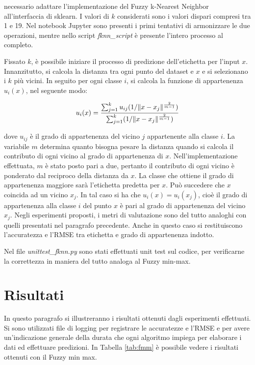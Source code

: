 \documentclass[11pt,  oneside, openany]{book}
\begin{document}
necessario adattare l'implementazione del Fuzzy k-Nearest Neighbor all'interfaccia di sklearn. I valori di $k$ considerati sono i valori dispari compresi tra 1 e 19. Nel notebook Jupyter sono presenti i primi tentativi di armonizzare le due operazioni, mentre nello script \textit{fknn\_script} è presente l'intero processo al completo. 

Fissato $k$, è possibile iniziare il processo di predizione dell'etichetta per l'input $x$. Innanzitutto, si calcola la distanza tra ogni punto del dataset e $x$ e si selezionano i $k$ più vicini. In seguito per ogni classe $i$, si calcola la funzione di appartenenza $u_{i}(x)$, nel seguente modo: 

\begin{equation} \label{eq:2}
u_{i}(x) = {\sum_{j=1}^k u_{ij}({1 / \Vert x-x_j\Vert^{\frac{2}{m-1}}}) \over \sum_{j=1}^k ({1 / \Vert x-x_j\Vert^{\frac{2}{m-1}}}) }
\end{equation}

\noindent dove $u_{ij}$ è il grado di appartenenza del vicino $j$ appartenente alla classe $i$. La variabile $m$ determina quanto bisogna pesare la distanza quando si calcola il contributo di ogni vicino al grado di appartenenza di $x$. Nell'implementazione effettuata, $m$ è stato posto pari a due, pertanto il contributo di ogni vicino è ponderato dal reciproco della distanza da $x$. La classe che ottiene il grado di appartenenza maggiore sarà l'etichetta predetta per $x$. Può succedere che $x$ coincida ad un vicino $x_j$. In tal caso si ha che $u_i(x) = u_i(x_j) $, cioè il grado di appartenenza alla classe $i$ del punto $x$ è pari al grado di appartenenza del vicino $x_j$. 
Negli esperimenti proposti, i metri di valutazione sono del tutto analoghi con quelli presentati nel paragrafo precedente. Anche in questo caso si restituiscono l'accuratezza e l'RMSE tra etichetta e grado di appartenenza indotto.

Nel file \textit{unittest\_fknn.py} sono stati effettuati unit test sul codice, per verificarne la correttezza in maniera del tutto analoga al Fuzzy min-max. 

	\section{Risultati}


In questo paragrafo si illustreranno i risultati ottenuti dagli esperimenti effettuati. Si sono utilizzati file di logging per registrare le accuratezze e l'RMSE e per avere un'indicazione generale della durata che ogni algoritmo impiega per elaborare i dati ed effettuare predizioni. In Tabella \ref{tab:fmm} è possibile vedere i risultati ottenuti con il Fuzzy min max. 
\end{document}

